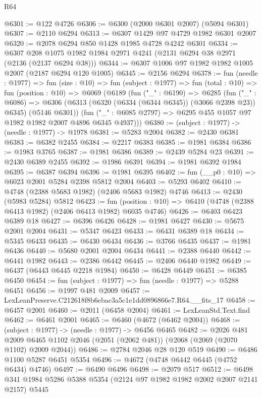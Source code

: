 \begin{lexlean}{R64}
\begin{coremodule}
@6301 := @122 @4726
@6306 := @6300 (@2000 @6301 @2007) (@5094 @6301)
@6307 := @2110 @6294
@6313 := @6307 @1429 @97 @4729 @1982 @6301 @2007
@6320 := @2078 @6294 @850 @1428 @1985 @4728 @4242 @6301
@6334 := @6307 @208 @1075 @1982 @1984 @2971 @4241 (@2131 @6294 @38 @2971 (@2136 (@2137 @6294 @38)))
@6344 := @6307 @1006 @97 @1982 @1982 @1005 @2007 (@2187 @6294 @120 @1005)
@6345 := @2156 @6294
@6378 := fun (needle : @1977) =>
  fun (size : @10) =>
  fun (subject : @1977) =>
  fun (total : @10) =>
  fun (position : @10) =>
  @6069
    (@6189
      (fun ("_" : @6190) =>
      @6285
        (fun ("_" : @6086) =>
        @6306 (@6313 (@6320 (@6334 (@6344 @6345)) (@3066 @2398 @23)) @6345) (@5146 @6301))
        (fun ("_" : @6085 @2797) => @6295 @455 @1057 @97 @1982 @1982 @2007 @4896 @6345 @4937)))
@6380 := (subject : @1977) -> (needle : @1977) -> @1978
@6381 := @5283 @2004
@6382 := @2430 @6381
@6383 := @6382 @2455
@6384 := @2217 @6383
@6385 := @1981 @6384
@6386 := @1983 @3765
@6387 := @1981 @6386
@6389 := @2439 @5284 @23
@6391 := @2430 @6389 @2455
@6392 := @1986 @6391
@6394 := @1981 @6392 @1984
@6395 := @6387 @6394
@6396 := @1981 @6395
@6402 := fun (__p0 : @10) => @6023 @2001 @5284 @2398 @5812 @2004
@6403 := @5293 @6402
@6410 := @4748 (@2388 @5683 @1982) (@2406 @5683 @1982) @4746
@6413 := @2430 (@5983 @5284) @5812
@6423 := fun (position : @10) => @6410 (@4748 (@2388 @6413 @1982) (@2406 @6413 @1982) @6035 @4746)
@6426 := @6403 @6423 @6389 @18
@6427 := @6396 @6426
@6428 := @1981 @6427
@6430 := @5675 @2001 @2004
@6431 := @5347 @6423
@6433 := @6431 @6389 @18
@6434 := @5345 @6433
@6435 := @6430 @6434
@6436 := @3766 @6435
@6437 := @1981 @6436
@6440 := @5680 @2001 @2004 @6434
@6441 := @2388 @6440
@6442 := @6441 @1982
@6443 := @2386 @6442
@6445 := @2406 @6440 @1982
@6449 := @6437 (@6443 @6445 @2218 @1984)
@6450 := @6428 @6449
@6451 := @6385 @6450
@6454 := fun (subject : @1977) => fun (needle : @1977) => @5288 @6451
@6456 := @1997 @481 @2009
@6457 := LexLeanPreserve.C212618f8b6ebac3a5c1e1dd0896866e7.R64.__fits_17
@6458 := @6457 @2001
@6460 := @2011 (@6458 @2004)
@6461 := LexLeanStd.Text.find
@6462 := @6461 @2001
@6465 := @6460 (@4672 (@6462 @2004))
@6468 := (subject : @1977) -> (needle : @1977) -> @6456 @6465
@6482 := @2026
    @481
    @2009
    @6465
    @1102
    @2046
    (@2051 (@2062 @481))
    (@2068 (@2069 (@2070 @1102) @2009 @2044))
@6486 := @2784 @2046 @28 @120 @519
@6490 := @6486 @1100 @5287 @6451 @5354
@6496 := @4672 (@4748 @6442 @6445 (@4752 @6434) @4746)
@6497 := @6490 @6496
@6498 := @2079 @517
@6512 := @6498 @341 @1984 @5286 @5388 @5354 (@2124 @97 @1982 @1982 @2002 @2007 @2141 @2157) @5445

\end{coremodule}
\end{lexlean}

